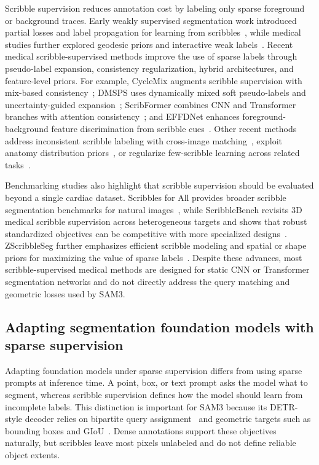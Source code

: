\documentclass[preprint,12pt]{elsarticle}
\begin{document}
Scribble supervision reduces annotation cost by labeling only sparse foreground or background traces. Early weakly supervised segmentation work introduced partial losses and label propagation for learning from scribbles~\cite{lin2016ScribbleSup}, while medical studies further explored geodesic priors and interactive weak labels~\cite{wang2018deepigeos}. Recent medical scribble-supervised methods improve the use of sparse labels through pseudo-label expansion, consistency regularization, hybrid architectures, and feature-level priors. For example, CycleMix augments scribble supervision with mix-based consistency~\cite{zhang2022cyclemix}; DMSPS uses dynamically mixed soft pseudo-labels and uncertainty-guided expansion~\cite{han2024DMSPS}; ScribFormer combines CNN and Transformer branches with attention consistency~\cite{li2024ScribFormer}; and EFFDNet enhances foreground-background feature discrimination from scribble cues~\cite{liu2025effdnet}. Other recent methods address inconsistent scribble labeling with cross-image matching~\cite{chen2025crossimage}, exploit anatomy distribution priors~\cite{zhang2025medcl}, or regularize few-scribble learning across related tasks~\cite{zhang2024modelmix}.

Benchmarking studies also highlight that scribble supervision should be evaluated beyond a single cardiac dataset. Scribbles for All provides broader scribble segmentation benchmarks for natural images~\cite{boettcher2024scribblesforall}, while ScribbleBench revisits 3D medical scribble supervision across heterogeneous targets and shows that robust standardized objectives can be competitive with more specialized designs~\cite{gotkowski2025scribblebench}. ZScribbleSeg further emphasizes efficient scribble modeling and spatial or shape priors for maximizing the value of sparse labels~\cite{zhang2026zscribbleseg}. Despite these advances, most scribble-supervised medical methods are designed for static CNN or Transformer segmentation networks and do not directly address the query matching and geometric losses used by SAM3.

\subsection{Adapting segmentation foundation models with sparse supervision}

Adapting foundation models under sparse supervision differs from using sparse prompts at inference time. A point, box, or text prompt asks the model what to segment, whereas scribble supervision defines how the model should learn from incomplete labels. This distinction is important for SAM3 because its DETR-style decoder relies on bipartite query assignment~\cite{carion2020detr,kuhn1955hungarian} and geometric targets such as bounding boxes and GIoU~\cite{rezatofighi2019giou}. Dense annotations support these objectives naturally, but scribbles leave most pixels unlabeled and do not define reliable object extents.
\end{document}
